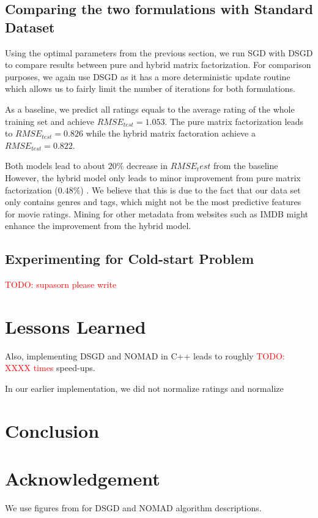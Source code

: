 \documentclass{article} %
\newcommand{\todo}[1]{\textcolor{red}{TODO: #1}}
\begin{document}
\subsection{Comparing the two formulations with Standard Dataset}

Using the optimal parameters from the previous section, we run SGD with DSGD
to compare results between pure and hybrid matrix factorization. For
comparison purposes, we again use DSGD as it has a more deterministic update
routine which allows us to fairly limit the number of iterations for both
formulations.

As a baseline, we predict all ratings equals to the average rating of the whole training set and achieve $RMSE_{test}=1.053$. The pure matrix factorization leads to $RMSE_{test}=0.826$ while the hybrid matrix factoration achieve a $RMSE_{test}=0.822$.

Both models lead to about $20\%$ decrease in $RMSE_test$ from the baseline
However, the hybrid model only leads to minor improvement from pure matrix factorization ($0.48\%$) .  We believe that this is due
to the fact that our data set only contains genres and tags, which might not
be the most predictive features for movie ratings.  Mining for other metadata
from websites such as IMDB might enhance the improvement from the hybrid
model.

\subsection{Experimenting for Cold-start Problem}

\todo{supasorn please write}

\section{Lessons Learned}

Also, implementing DSGD and NOMAD in C++ leads to roughly \todo{XXXX times} speed-ups.

In our earlier implementation, we did not normalize ratings and normalize

\section{Conclusion}

\section{Acknowledgement}
We use figures from \cite{yun2013nomad} for DSGD and NOMAD algorithm descriptions.


{}
\end{document}
